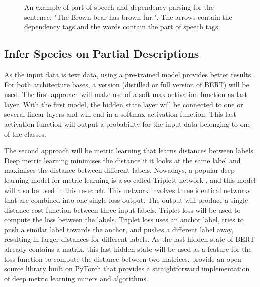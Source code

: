 \documentclass[a4paper, 12pt, oneside]{book} %
\begin{document}
\begin{figure} [t]
    \centering
    \vspace{0cm}
    \makebox[\textwidth][c]{}
    \caption{An example of part of speech and dependency parsing for the sentence: "The Brown bear has brown fur.". The arrows contain the dependency tags and the words contain the part of speech tags.}
    \label{fig:PoS_example}
\end{figure}

\subsection{Infer Species on Partial Descriptions}
As the input data is text data, using a pre-trained model provides better results \autocite{devlin_bert_2019, sanh_distilbert_2020, mikolov_distributed_2013}.
For both architecture bases, a version (distilled or full version of BERT) will be used.
The first approach will make use of a soft max activation function as last layer.
With the first model, the hidden state layer will be connected to one or several linear layers and will end in a softmax activation function.
This last activation function will output a probability for the input data belonging to one of the classes.

The second approach will be metric learning that learns distances between labels.
Deep metric learning minimises the distance if it looks at the same label and maximises the distance between different labels.
Nowadays, a popular deep learning model for metric learning is a so-called Triplett network \autocite{hoffer_deep_2015}, and this model will also be used in this research.
This network involves three identical networks that are combined into one single loss output.
The output will produce a single distance cost function between three input labels.
Triplet loss \autocite{schroff_facenet_2015} will be used to compute the loss between the labels.
Triplet loss uses an anchor label, tries to push a similar label towards the anchor, and pushes a different label away, resulting in larger distances for different labels.
As the last hidden state of BERT already contains a matrix, this last hidden state will be used as a feature for the loss function to compute the distance between two matrices.
\textcite{musgrave_pytorch_2020} provide an open-source library built on PyTorch that provides a straightforward implementation of deep metric learning miners and algorithms.
\end{document}
